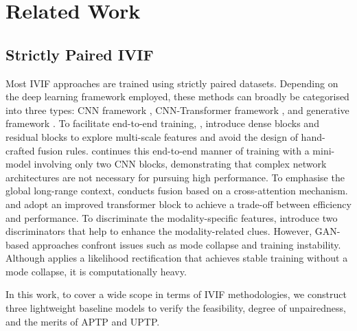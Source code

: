 \section{Related Work}
\label{sec:related}
\subsection{Strictly Paired IVIF}
Most IVIF approaches are trained using strictly paired datasets. 
Depending on the deep learning framework employed, these methods can broadly be categorised into three types: CNN framework \cite{densefuse, rfn-nest, mufusion, mmdrfuse, lrrnet}, CNN-Transformer framework \cite{swinfusion, cddfuse, emma, AFTfusion}, and generative framework \cite{fusiongan, tardal, tgfuse, ddfm}.
To facilitate end-to-end training, \cite{densefuse}, \cite{rfn-nest} introduce dense blocks and residual blocks to explore multi-scale features and avoid the design of hand-crafted fusion rules. 
\cite{mmdrfuse} continues this end-to-end manner of training with a mini-model involving only two CNN blocks, demonstrating that complex network architectures are not necessary for pursuing high performance.
To emphasise the global long-range context, \cite{swinfusion} conducts fusion based on a cross-attention mechanism.
\cite{cddfuse} and \cite{emma} adopt an improved transformer block\cite{restormer} to achieve a trade-off between efficiency and performance.
To discriminate the modality-specific features, \cite{tardal, tgfuse} introduce two discriminators that help to enhance the modality-related clues.
However, GAN-based approaches confront issues such as mode collapse and training instability.
Although \cite{ddfm} applies a likelihood rectification that achieves stable training without a mode collapse, it is computationally heavy.  

In this work, to cover a wide scope in terms of IVIF methodologies, we construct three lightweight baseline models to verify the feasibility, degree of unpairedness, and the merits of APTP and UPTP. 
